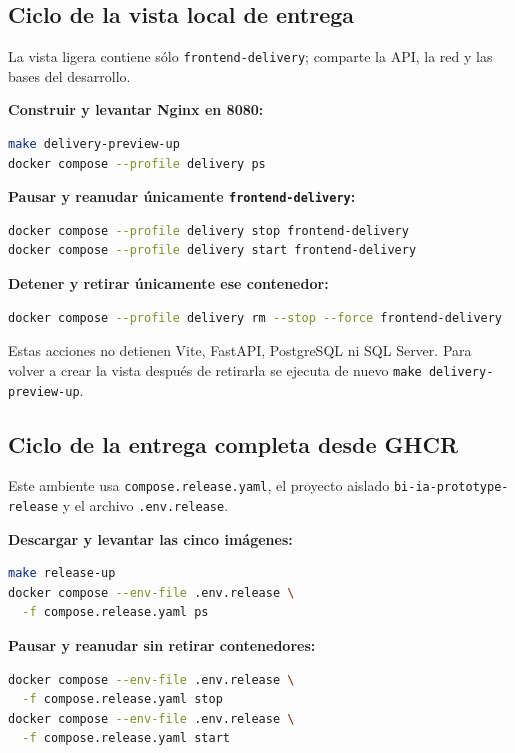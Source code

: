 \documentclass[11pt,letterpaper]{article}
\newcommand{\file}[1]{\texttt{#1}}
\begin{document}
\subsection{Ciclo de la vista local de entrega}

La vista ligera contiene sólo \file{frontend-delivery}; comparte la API, la red y las bases del desarrollo.

\textbf{Construir y levantar Nginx en 8080:}

\begin{lstlisting}[style=terminal,language=bash]
make delivery-preview-up
docker compose --profile delivery ps
\end{lstlisting}

\textbf{Pausar y reanudar únicamente \file{frontend-delivery}:}

\begin{lstlisting}[style=terminal,language=bash]
docker compose --profile delivery stop frontend-delivery
docker compose --profile delivery start frontend-delivery
\end{lstlisting}

\textbf{Detener y retirar únicamente ese contenedor:}

\begin{lstlisting}[style=terminal,language=bash]
docker compose --profile delivery rm --stop --force frontend-delivery
\end{lstlisting}

Estas acciones no detienen Vite, FastAPI, PostgreSQL ni SQL Server. Para volver a crear la vista después de retirarla se ejecuta de nuevo \file{make delivery-preview-up}.

\subsection{Ciclo de la entrega completa desde GHCR}

Este ambiente usa \file{compose.release.yaml}, el proyecto aislado \file{bi-ia-prototype-release} y el archivo \file{.env.release}.

\textbf{Descargar y levantar las cinco imágenes:}

\begin{lstlisting}[style=terminal,language=bash]
make release-up
docker compose --env-file .env.release \
  -f compose.release.yaml ps
\end{lstlisting}

\textbf{Pausar y reanudar sin retirar contenedores:}

\begin{lstlisting}[style=terminal,language=bash]
docker compose --env-file .env.release \
  -f compose.release.yaml stop
docker compose --env-file .env.release \
  -f compose.release.yaml start
\end{lstlisting}
\end{document}

